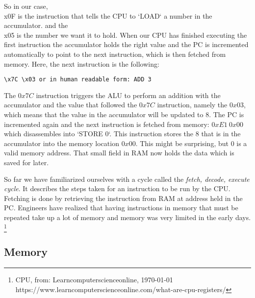 So in our case, \\x0F is the instruction that tells the CPU to `LOAD` a number in the accumulator.
and the \\x05 is the number we want it to hold. When our CPU has finished executing the first
instruction the accumulator holds the right value and the PC is incremented automatically to point
to the next instruction, which is then fetched from memory. Here, the next instruction is the
following:

\begin{lstlisting}
\x7C \x03 or in human readable form: ADD 3
\end{lstlisting}

The $0x7C$ instruction triggers the ALU to perform an addition with the accumulator and
the value that followed the $0x7C$ instruction, namely the $0x03$, which means that the value
in the accumulator will be updated to 8. The PC is incremented again and the next instruction is
fetched from memory: $0xE1\ 0x00$ which disassembles into `STORE 0`. This instruction stores the 8 
that is in the accumulator into the memory location $0x00$. This might be surprising, but 0 is a
valid memory address. That small field in RAM now holds the data which is saved for later.

So far we have familiarized ourselves with a cycle called the \textit{fetch, decode, execute cycle}. It 
describes the steps taken for an instruction to be run by the CPU. Fetching is done by retrieving
the instruction from RAM at address held in the PC. Engineers have realized that having instructions in memory that must be repeated take up a lot of memory
and memory was very limited in the early days. \footnote{CPU, from: Learncomputerscienceonline, \today \\ https://www.learncomputerscienceonline.com/what-are-cpu-registers/}

\subsection{Memory}

